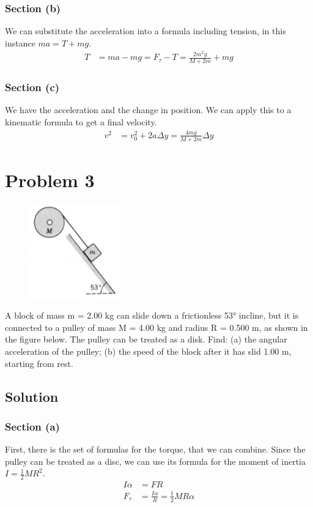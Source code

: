 \documentclass[12pt]{article}
\begin{document}
\subsubsection{Section (b)}
We can substitute the acceleration into a formula including tension, in this instance \(ma = T + mg\).
\begin{align}
    T   &=  ma - mg
    =   F_\tau - T
        =   \frac{2m^2g}{M + 2m} + mg
\end{align}

\subsubsection{Section (c)}
We have the acceleration and the change in position. We can apply this to a kinematic formula to get a final velocity.
\begin{align}
    v^2 &=  v_0^2 + 2a\Delta y
        =   \frac{4mg}{M + 2m}\Delta y
\end{align}

\pagebreak
\section{Problem 3}
\begin{figure}
    \vspace{-30pt}
    \includegraphics[width=0.35\textwidth]{graph_3.png} 
\end{figure}
A block of mass m = 2.00 kg can slide down a frictionless 53\unit{\degree} incline, but it is connected to a pulley of mass M = 4.00 kg and radius R = 0.500 m, as shown in the figure below. The pulley can be treated as a disk. Find: (a) the angular acceleration of the pulley; (b) the speed of the block after it has slid 1.00 m, starting from rest.

\subsection{Solution}
\subsubsection{Section (a)}
First, there is the set of formulas for the torque, that we can combine. Since the pulley can be treated as a disc, we can use its formula for the moment of inertia \(I = \frac{1}{2}MR^2\).
\begin{align}
    I\alpha &=  F R\\
    F_\tau  &=  \frac{I\alpha}{R}
        =   \frac{1}{2}MR\alpha
\end{align}
\end{document}
